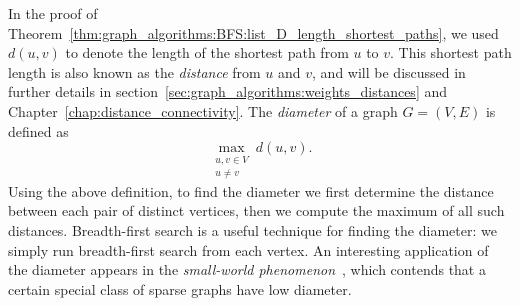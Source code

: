 In the proof of
Theorem~\ref{thm:graph_algorithms:BFS:list_D_length_shortest_paths},
we used $d(u,v)$ to denote the length of the shortest path from $u$ to
$v$. This shortest path length is also known as the
\emph{distance} from $u$ and $v$, and will be
discussed in further details in
section~\ref{sec:graph_algorithms:weights_distances} and
Chapter~\ref{chap:distance_connectivity}. The
\emph{diameter} of a graph $G = (V,E)$ is defined as
\[
\max_{\substack{u,v \in V \\ u \neq v}} d(u,v).
\]
Using the above definition, to find the diameter we
first determine the distance between each pair of
distinct vertices, then we compute the maximum of all such
distances. Breadth-first search is a
useful technique for finding the diameter: we simply
run breadth-first search from each
vertex. An interesting application of the diameter
appears in the
\emph{small-world phenomenon}~\cite{Kleinberg2000,
  Milgram1967,WattsStrogatz1998}, which contends that a certain
special class of sparse graphs have low diameter.




